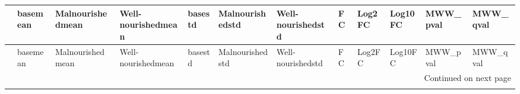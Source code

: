 \begin{longtable}{llllllllllll}
\toprule
{} &            basemean &    Malnourishedmean &  Well-nourishedmean &             basestd &     Malnourishedstd &   Well-nourishedstd &                  FC &                 Log2FC &                 Log10FC &                MWW\_pval &               MWW\_qval \\
\midrule
\endfirsthead

\toprule
{} &            basemean &    Malnourishedmean &  Well-nourishedmean &             basestd &     Malnourishedstd &   Well-nourishedstd &                  FC &                 Log2FC &                 Log10FC &                MWW\_pval &               MWW\_qval \\
\midrule
\endhead
\midrule
\multicolumn{12}{r}{{Continued on next page}} \\
\midrule
\endfoot


\end{longtable}
